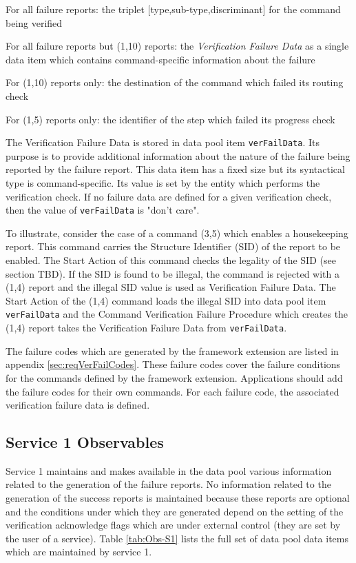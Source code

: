 \documentclass[a4paper,10pt]{article}
\newenvironment{fw_itemize}						%
{\begin{itemize}
  \setlength{\itemsep}{1mm}
  \setlength{\parskip}{0pt}
  \setlength{\parsep}{0pt}}
{\end{itemize}}
\begin{document}
\begin{fw_itemize}
\item For all failure reports: the triplet [type,sub-type,discriminant] for the command being verified
\item For all failure reports but (1,10) reports: the \textit{Verification Failure Data} as a single data item which contains command-specific information about the failure 
\item For (1,10) reports only: the destination of the command which failed its routing check
\item For (1,5) reports only: the identifier of the step which failed its progress check
\end{fw_itemize}

The Verification Failure Data is stored in data pool item \texttt{verFailData}. Its purpose is to provide additional information about the nature of the failure being reported by the failure report. This data item has a fixed size but its syntactical type is command-specific. Its value is set by the entity which performs the verification check. If no failure data are defined for a given verification check, then the value of \texttt{verFailData} is "don't care". 

To illustrate, consider the case of a command (3,5) which enables a housekeeping report. This command carries the Structure Identifier (SID) of the report to be enabled. The Start Action of this command checks the legality of the SID (see section TBD). If the SID is found to be illegal, the command is rejected with a (1,4) report and the illegal SID value is used as Verification Failure Data. The Start Action of the (1,4) command loads the illegal SID into data pool item \texttt{verFailData} and the Command Verification Failure Procedure which creates the (1,4) report takes the Verification Failure Data from \texttt{verFailData}.

The failure codes which are generated by the framework extension are listed in appendix \ref{sec:reqVerFailCodes}. These failure codes cover the failure conditions for the commands defined by the framework extension. Applications should add the failure codes for their own commands. For each failure code, the associated verification failure data is defined.

\subsection{Service 1 Observables}\label{sec:serv1Obs}
Service 1 maintains and makes available in the data pool various information related to the generation of the failure reports. No information related to the generation of the success reports is maintained because these reports are optional and the conditions under which they are generated depend on the setting of the verification acknowledge flags which are under external control (they are set by the user of a service). Table \ref{tab:Obs-S1} lists the full set of data pool data items which are maintained by service 1.
\end{document}
